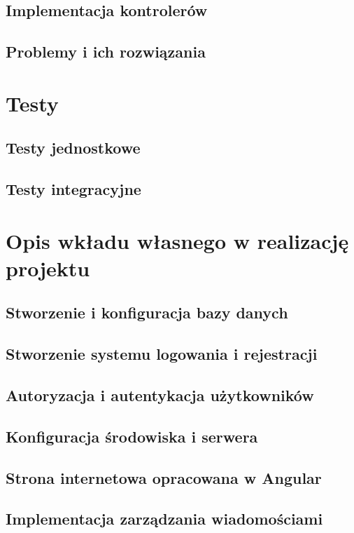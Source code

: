 \documentclass[10pt,a4paper]{article}
\begin{document}
\subsection{Implementacja kontrolerów}		%
\subsection{Problemy i ich rozwiązania}		%

\section{Testy}

\subsection{Testy jednostkowe}   %
\subsection{Testy integracyjne}  %

\section{Opis wkładu własnego w realizację projektu}

\subsection{Stworzenie i konfiguracja bazy danych}
\subsection{Stworzenie systemu logowania i rejestracji}
\subsection{Autoryzacja i autentykacja użytkowników}
\subsection{Konfiguracja środowiska i serwera}

\subsection{Strona internetowa opracowana w Angular}
\subsection{Implementacja zarządzania wiadomościami}
\end{document}
